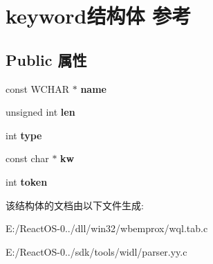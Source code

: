 \hypertarget{structkeyword}{}\section{keyword结构体 参考}
\label{structkeyword}
\subsection*{Public 属性}
\begin{DoxyCompactItemize}
\item 
\mbox{\label{structkeyword_aa4c33e7a2f9e6bd3a6bf5702f21e3468}} 
const W\+C\+H\+AR $\ast$ {\bfseries name}
\item 
\mbox{\label{structkeyword_aaaeacf6c61dfe6d46ab30c9519185c93}} 
unsigned int {\bfseries len}
\item 
\mbox{\label{structkeyword_ae7757092d88eb44ec8df592622a4770c}} 
int {\bfseries type}
\item 
\mbox{\label{structkeyword_affde592638adfb22bea10bcc74546240}} 
const char $\ast$ {\bfseries kw}
\item 
\mbox{\label{structkeyword_ab2deb9b4eb506083973e7f1f1bb29bcf}} 
int {\bfseries token}
\end{DoxyCompactItemize}


该结构体的文档由以下文件生成\+:\begin{DoxyCompactItemize}
\item 
E\+:/\+React\+O\+S-\/0../dll/win32/wbemprox/wql.\+tab.\+c\item 
E\+:/\+React\+O\+S-\/0../sdk/tools/widl/parser.\+yy.\+c\end{DoxyCompactItemize}
